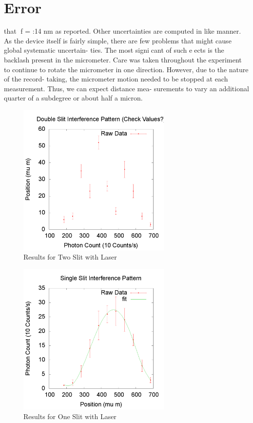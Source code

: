 \documentclass[12pt,twocolumn]{article}
\begin{document}
\section{Error}
 that f = :14 nm as reported. Other uncertainties are
computed in like manner.
As the device itself is fairly simple, there are few
problems that might cause global systematic uncertain-
ties. The most signicant of such eects is the backlash
present in the micrometer. Care was taken throughout
the experiment to continue to rotate the micrometer in
one direction. However, due to the nature of the record-
taking, the micrometer motion needed to be stopped at
each measurement. Thus, we can expect distance mea-
surements to vary an additional quarter of a subdegree
or about half a micron.

\begin{figure}[h!]
	\centering
	\label{fig:2slit}
	\includegraphics[width=3in]{images/Twoslit}
	\caption{Results for Two Slit with Laser}
\end{figure}
\begin{figure}[h!]
	\centering
	\label{fig:1slit}
	\includegraphics[width=3in]{images/Oneslit}
	\caption{Results for One Slit with Laser}
\end{figure}
\end{document}

